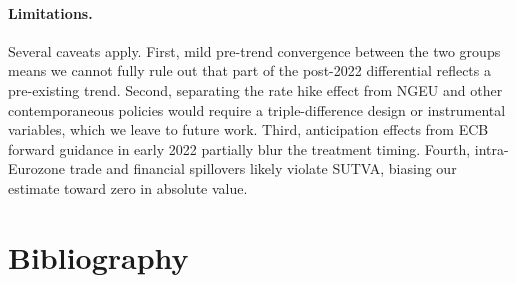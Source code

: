\documentclass[11pt,a4paper]{article}
\begin{document}
\paragraph{Limitations.} Several caveats apply. First, mild pre-trend convergence between
the two groups means we cannot fully rule out that part of the post-2022 differential
reflects a pre-existing trend. Second, separating the rate hike effect from NGEU and
other contemporaneous policies would require a triple-difference design or instrumental
variables, which we leave to future work. Third, anticipation effects from ECB forward
guidance in early 2022 partially blur the treatment timing. Fourth, intra-Eurozone trade
and financial spillovers likely violate SUTVA, biasing our estimate toward zero in absolute
value.

\section*{Bibliography}
\end{document}
